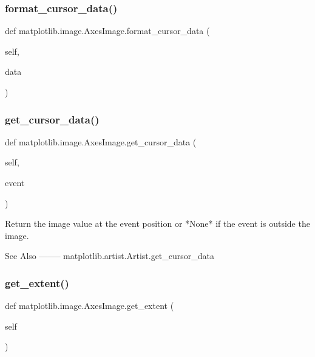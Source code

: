 \subsubsection{\texorpdfstring{format\+\_\+cursor\+\_\+data()}{format\_cursor\_data()}}
{\footnotesize\ttfamily def matplotlib.\+image.\+Axes\+Image.\+format\+\_\+cursor\+\_\+data (\begin{DoxyParamCaption}\item[{}]{self,  }\item[{}]{data }\end{DoxyParamCaption})}

\mbox{\label{classmatplotlib_1_1image_1_1AxesImage_a3b1ea95e189d4a9c4f864c886be03333}} 
\subsubsection{\texorpdfstring{get\+\_\+cursor\+\_\+data()}{get\_cursor\_data()}}
{\footnotesize\ttfamily def matplotlib.\+image.\+Axes\+Image.\+get\+\_\+cursor\+\_\+data (\begin{DoxyParamCaption}\item[{}]{self,  }\item[{}]{event }\end{DoxyParamCaption})}

\begin{DoxyVerb}Return the image value at the event position or *None* if the event is
outside the image.

See Also
--------
matplotlib.artist.Artist.get_cursor_data
\end{DoxyVerb}
 \mbox{\label{classmatplotlib_1_1image_1_1AxesImage_a3ea8bf235d707c8cb759dc1ebac3cb78}} 
\subsubsection{\texorpdfstring{get\+\_\+extent()}{get\_extent()}}
{\footnotesize\ttfamily def matplotlib.\+image.\+Axes\+Image.\+get\+\_\+extent (\begin{DoxyParamCaption}\item[{}]{self }\end{DoxyParamCaption})}

